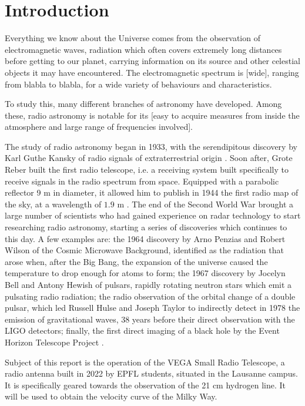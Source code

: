 \section{Introduction}
Everything we know about the Universe comes from the observation of electromagnetic waves, radiation which often covers extremely long distances before getting to our planet, carrying information on its source and other celestial objects it may have encountered.
The electromagnetic spectrum is [wide], ranging from blabla to blabla, for a wide variety of behaviours and characteristics.

To study this, many different branches of astronomy have developed. Among these, radio astronomy is notable for its [easy to acquire measures from inside the atmosphere and large range of frequencies involved].

The study of radio astronomy began in 1933, with the serendipitous discovery by Karl Guthe Kansky of radio signals of extraterrestrial origin \cite{condon_essential_2016}. 
Soon after, Grote Reber built the first radio telescope, i.e. a receiving system built specifically to receive signals in the radio spectrum from space. Equipped with a parabolic reflector 9 m in diameter, it allowed him to publish in 1944 the first radio map of the sky, at a wavelength of $1.9$ m \cite{lauterbach_radio_2022}.
The end of the Second World War brought a large number of scientists who had gained experience on radar technology to start researching radio astronomy, starting a series of discoveries which continues to this day.
A few examples are: 
the 1964 discovery by Arno Penzias and Robert Wilson of the Cosmic Microwave Background, identified as the radiation that arose when, after the Big Bang, the expansion of the universe caused the temperature to drop enough for atoms to form;
the 1967 discovery by Jocelyn Bell and Antony Hewish of pulsars, rapidly rotating neutron stars which emit a pulsating radio radiation; 
the radio observation of the orbital change of a double pulsar, which led Russell Hulse and Joseph Taylor to indirectly detect in 1978 the emission of gravitational waves, 38 years before their direct observation with the LIGO detectors;
finally, the first direct imaging of a black hole by the Event Horizon Telescope Project \cite{the_event_horizon_telescope_collaboration_first_2019}.

Subject of this report is the operation of the VEGA Small Radio Telescope, a radio antenna built in 2022 by EPFL students, situated in the Lausanne campus.
It is specifically geared towards the observation of the 21 cm hydrogen line.
It will be used to obtain the velocity curve of the Milky Way.


